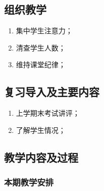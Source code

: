\jxhj{%
	}
\skrq{%
	}

\makeshouye %

\subsection{组织教学}
\begin{enumerate}[\hspace{2em}1、]
	\item 集中学生注意力；
	\item 清查学生人数；
	\item 维持课堂纪律；
\end{enumerate}
\subsection{复习导入及主要内容}
\begin{enumerate}[\hspace{2em}1、]
	\item 上学期末考试讲评；

	\item 了解学生情况；
\end{enumerate}
\subsection{教学内容及过程}
\subsubsection{本期教学安排} 
